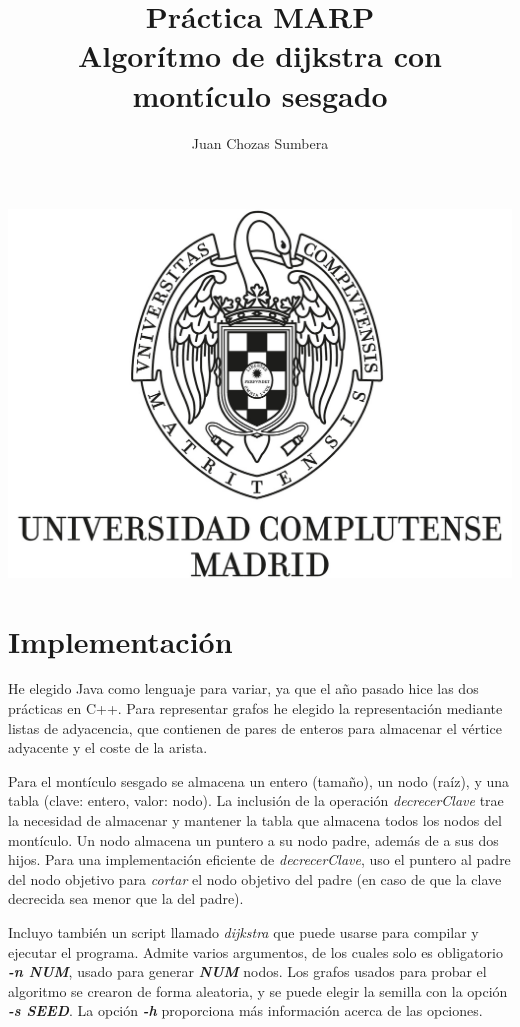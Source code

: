 \documentclass[12pt , a4paper]{article}
\title{Práctica MARP\\Algorítmo de dijkstra con montículo sesgado}
\author{Juan Chozas Sumbera}
\begin{document}
	
	\maketitle
	\begin{center}
		\includegraphics[width=\textwidth]{logo_UCM.jpg}
	\end{center}
	
	\newpage
	
\section{Implementación}
	
	He elegido Java como lenguaje para variar, ya que el año pasado hice las dos prácticas en C++. Para representar grafos he elegido la representación mediante listas de adyacencia, que contienen de pares de enteros para almacenar el vértice adyacente y el coste de la arista.
	
	Para el montículo sesgado se almacena un entero (tamaño), un nodo (raíz), y una tabla (clave: entero, valor: nodo). La inclusión de la operación \textit{decrecerClave} trae la necesidad de almacenar y mantener la tabla que almacena todos los nodos del montículo. Un nodo almacena un puntero a su nodo padre, además de a sus dos hijos. Para una implementación eficiente de \textit{decrecerClave}, uso el puntero al padre del nodo objetivo para \textit{cortar} el nodo objetivo del padre (en caso de que la clave decrecida sea menor que la del padre).
	
	Incluyo también un script llamado \textit{dijkstra} que puede usarse para compilar y ejecutar el programa. Admite varios argumentos, de los cuales solo es obligatorio \textbf{\textit{-n NUM}}, usado para generar \textit{\textbf{NUM}} nodos.  Los grafos usados para probar el algoritmo se crearon de forma aleatoria, y se puede elegir la semilla con la opción \textbf{\textit{-s SEED}}. La opción \textbf{\textit{-h}} proporciona más información acerca de las opciones.
\end{document}
